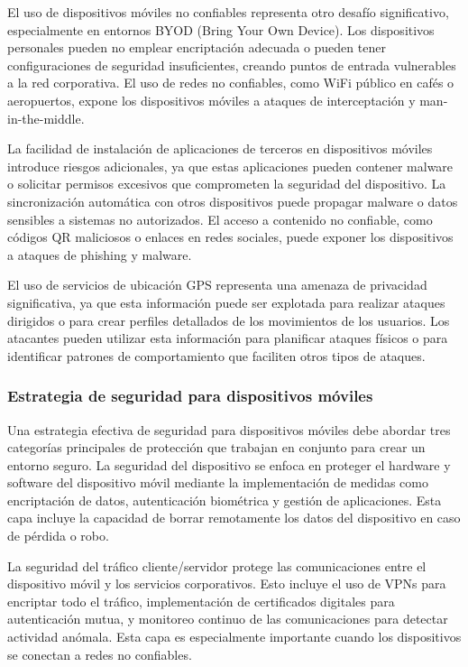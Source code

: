 El uso de dispositivos móviles no confiables representa otro desafío significativo, especialmente en entornos BYOD (Bring Your Own Device). Los dispositivos personales pueden no emplear encriptación adecuada o pueden tener configuraciones de seguridad insuficientes, creando puntos de entrada vulnerables a la red corporativa. El uso de redes no confiables, como WiFi público en cafés o aeropuertos, expone los dispositivos móviles a ataques de interceptación y man-in-the-middle.

La facilidad de instalación de aplicaciones de terceros en dispositivos móviles introduce riesgos adicionales, ya que estas aplicaciones pueden contener malware o solicitar permisos excesivos que comprometen la seguridad del dispositivo. La sincronización automática con otros dispositivos puede propagar malware o datos sensibles a sistemas no autorizados. El acceso a contenido no confiable, como códigos QR maliciosos o enlaces en redes sociales, puede exponer los dispositivos a ataques de phishing y malware.

El uso de servicios de ubicación GPS representa una amenaza de privacidad significativa, ya que esta información puede ser explotada para realizar ataques dirigidos o para crear perfiles detallados de los movimientos de los usuarios. Los atacantes pueden utilizar esta información para planificar ataques físicos o para identificar patrones de comportamiento que faciliten otros tipos de ataques.

\subsubsection{Estrategia de seguridad para dispositivos móviles}

Una estrategia efectiva de seguridad para dispositivos móviles debe abordar tres categorías principales de protección que trabajan en conjunto para crear un entorno seguro. La seguridad del dispositivo se enfoca en proteger el hardware y software del dispositivo móvil mediante la implementación de medidas como encriptación de datos, autenticación biométrica y gestión de aplicaciones. Esta capa incluye la capacidad de borrar remotamente los datos del dispositivo en caso de pérdida o robo.

La seguridad del tráfico cliente/servidor protege las comunicaciones entre el dispositivo móvil y los servicios corporativos. Esto incluye el uso de VPNs para encriptar todo el tráfico, implementación de certificados digitales para autenticación mutua, y monitoreo continuo de las comunicaciones para detectar actividad anómala. Esta capa es especialmente importante cuando los dispositivos se conectan a redes no confiables.

